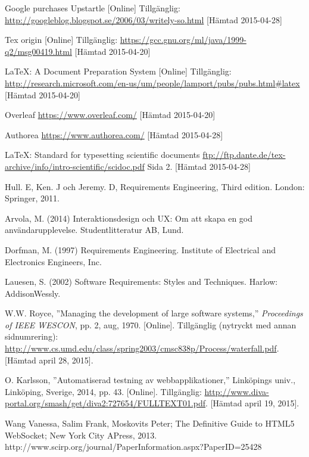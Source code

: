\begin{thebibliography}{9}
Google purchases Upstartle [Online] Tillgänglig: 
\url{http://googleblog.blogspot.se/2006/03/writely-so.html} [Hämtad 2015-04-28]

Tex origin [Online] Tillgänglig: 
\url{https://gcc.gnu.org/ml/java/1999-q2/msg00419.html} [Hämtad 2015-04-20]

LaTeX: A Document Preparation System [Online] Tillgänglig: 
\url{http://research.microsoft.com/en-us/um/people/lamport/pubs/pubs.html#latex} [Hämtad 2015-04-20]

Overleaf 
\url{https://www.overleaf.com/} [Hämtad 2015-04-20]

Authorea 
\url{https://www.authorea.com/} [Hämtad 2015-04-28]
 
LaTeX: Standard for typesetting scientific documents
\url{ftp://ftp.dante.de/tex-archive/info/intro-scientific/scidoc.pdf} Sida 2. [Hämtad 2015-04-28]


Hull. E, Ken. J och Jeremy. D, Requirements Engineering, Third edition. London: Springer, 2011.

Arvola, M. (2014) Interaktionsdesign och UX: Om att skapa en god användarupplevelse. Studentlitteratur AB, Lund.

Dorfman, M. (1997) Requirements Engineering. Institute of Electrical and Electronics Engineers, Inc. 

Lauesen, S. (2002) Software Requirements: Styles and Techniques. Harlow: AddisonWessly.


W.W. Royce, ''Managing the development of large software systems,''
\textit{Proceedings of IEEE WESCON}, pp. 2, aug, 1970.
[Online].
Tillgänglig (nytryckt med annan sidnumrering):
\url{http://www.cs.umd.edu/class/spring2003/cmsc838p/Process/waterfall.pdf}.
[Hämtad april 28, 2015].

O. Karlsson, ''Automatiserad testning av webbapplikationer,''
Linköpings univ., Linköping, Sverige, 2014, pp. 43.
[Online]. 
Tillgänglig: 
\url{http://www.diva-portal.org/smash/get/diva2:727654/FULLTEXT01.pdf}.
[Hämtad april 19, 2015].

 Wang Vanessa, Salim Frank, Moskovits Peter; The Definitive Guide to HTML5 WebSocket; New York City APress, 2013.
 http://www.scirp.org/journal/PaperInformation.aspx?PaperID=25428


\end{thebibliography}
